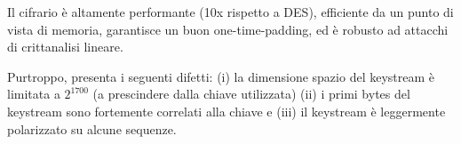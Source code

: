 Il cifrario è altamente performante (10x rispetto a DES), efficiente da un punto di vista di memoria, garantisce un buon one-time-padding, ed è robusto ad attacchi di crittanalisi lineare.

Purtroppo, presenta i seguenti difetti:
(i) la dimensione spazio del keystream è limitata a $2^{1700}$ (a prescindere dalla chiave utilizzata)
(ii) i primi bytes del keystream sono fortemente correlati alla chiave e
(iii) il keystream è leggermente polarizzato su alcune sequenze.
